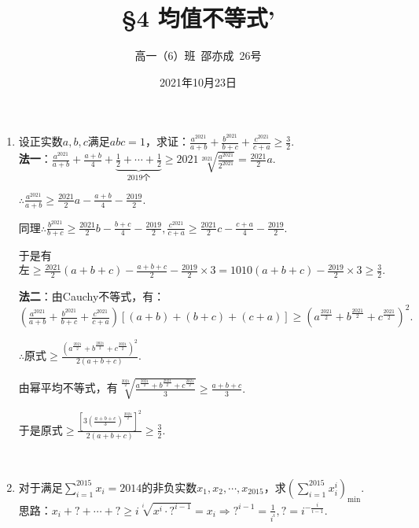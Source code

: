 \documentclass[8pt]{article}
\title{\S 4 均值不等式'}
\author{高一（6）班\ 邵亦成\ 26号}
\date{2021年10月23日}
\begin{document}
	\maketitle

	\begin{enumerate}
		\item 设正实数$a, b, c$满足$abc=1$，求证：$\displaystyle \frac{a^{2021}}{a+b}+\frac{b^{2021}}{b+c}+\frac{c^{2021}}{c+a}\geq\frac{3}{2}.$
			~\\

			\textbf{法一}：$\displaystyle \frac{a^{2021}}{a+b} + \frac{a+b}{4} + \underbrace{\frac{1}{2} + \cdots + \frac{1}{2}}_{2019\text{个}} \geq 2021\sqrt[2021]{\frac{a^{2021}}{2^{2021}}}=\frac{2021}{2}a.$

				$\therefore \displaystyle \frac{a^{2021}}{a+b}\geq\frac{2021}{2}a-\frac{a+b}{4}-\frac{2019}{2}.$

				同理$\therefore \displaystyle \frac{b^{2021}}{b+c}\geq\frac{2021}{2}b-\frac{b+c}{4}-\frac{2019}{2}, \frac{c^{2021}}{c+a}\geq\frac{2021}{2}c-\frac{c+a}{4}-\frac{2019}{2}.$

				于是有$\text{左}\geq\displaystyle\frac{2021}{2}(a+b+c)-\frac{a+b+c}{2}-\frac{2019}{2}\times3=1010(a+b+c)-\frac{2019}{2}\times 3\geq\frac{3}{2}.$

			\textbf{法二}：由Cauchy不等式，有：$\displaystyle \left(\frac{a^{2021}}{a+b}+\frac{b^{2021}}{b+c}+\frac{c^{2021}}{c+a}\right)\left[(a+b)+(b+c)+(c+a)\right]\geq\left(a^\frac{2021}{2}+b^\frac{2021}{2}+c^\frac{2021}{2}\right)^2.$

				$\therefore \text{原式}\geq\frac{\left(a^\frac{2021}{2}+b^\frac{2021}{2}+c^\frac{2021}{2}\right)^2}{2(a+b+c)}.$

				由幂平均不等式，有$\displaystyle \sqrt[\frac{2021}{2}]{\frac{a^{\frac{2021}{2}}+b^{\frac{2021}{2}}+c^{\frac{2021}{2}}}{3}}\geq\frac{a+b+c}{3}.$

				于是原式$\geq\displaystyle\frac{\left[3\left(\frac{a+b+c}{3}\right)^{\frac{2021}{2}}\right]^2}{2(a+b+c)}\geq\frac{3}{2}.$

		~\\

		\item 对于满足$\displaystyle\sum_{i=1}^{2015}x_i=2014$的非负实数$x_1, x_2, \cdots, x_2015$，求$\displaystyle\left(\sum_{i=1}^{2015}x_i^i\right)_{\min}$.
			~\\

			思路：$\displaystyle x_i+?+\cdots+?\geq i\sqrt[i]{x^i\cdot?^{i-1}}=x_i \Rightarrow ?^{i-1}=\frac{1}{i^i}, ?=i^{-\frac{i}{i-1}}.$


\end{enumerate}
\end{document}
